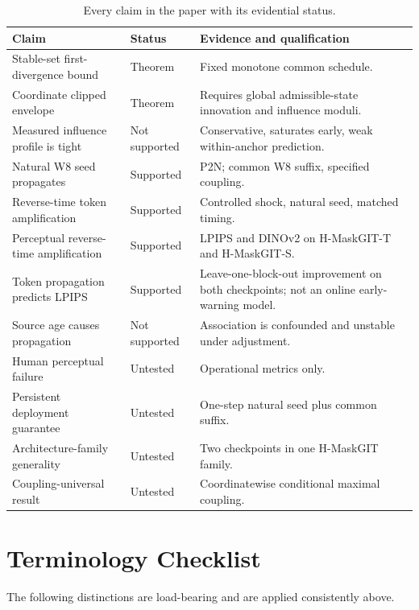 \documentclass[11pt,a4paper]{article}
\theoremstyle{plain}
\theoremstyle{definition}
\theoremstyle{remark}
\begin{document}
\begin{table}[h]
\centering
\small
\caption{Every claim in the paper with its evidential status.}
\label{tab:claims}
\begin{tabular}{@{}p{} p{} p{}@{}}
\toprule
Claim & Status & Evidence and qualification \\
\midrule
Stable-set first-divergence bound & Theorem & Fixed monotone common schedule. \\
Coordinate clipped envelope & Theorem & Requires global admissible-state
innovation and influence moduli. \\
Measured influence profile is tight & Not supported & Conservative, saturates
early, weak within-anchor prediction. \\
Natural W8 seed propagates & Supported & P2N; common W8 suffix, specified
coupling. \\
Reverse-time token amplification & Supported & Controlled shock, natural seed,
matched timing. \\
Perceptual reverse-time amplification & Supported & LPIPS and DINOv2 on
H-MaskGIT-T and H-MaskGIT-S. \\
Token propagation predicts LPIPS & Supported & Leave-one-block-out improvement on
both checkpoints; not an online early-warning model. \\
Source age causes propagation & Not supported & Association is confounded and
unstable under adjustment. \\
Human perceptual failure & Untested & Operational metrics only. \\
Persistent deployment guarantee & Untested & One-step natural seed plus common
suffix. \\
Architecture-family generality & Untested & Two checkpoints in one H-MaskGIT
family. \\
Coupling-universal result & Untested & Coordinatewise conditional maximal
coupling. \\
\bottomrule
\end{tabular}
\end{table}

\section{Terminology Checklist}
\label{app:terms}

The following distinctions are load-bearing and are applied consistently above.
\end{document}

